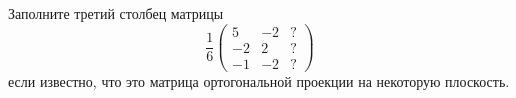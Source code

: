 \documentclass{article}
\begin{document}
Заполните третий столбец матрицы
$$ \frac{1}{6} \left( \begin{array}{ccc} 5&-2&?\\-2&2&?\\-1&-2&? \end{array} \right) $$
если известно, что это матрица ортогональной проекции на некоторую плоскость.
\end{document}

